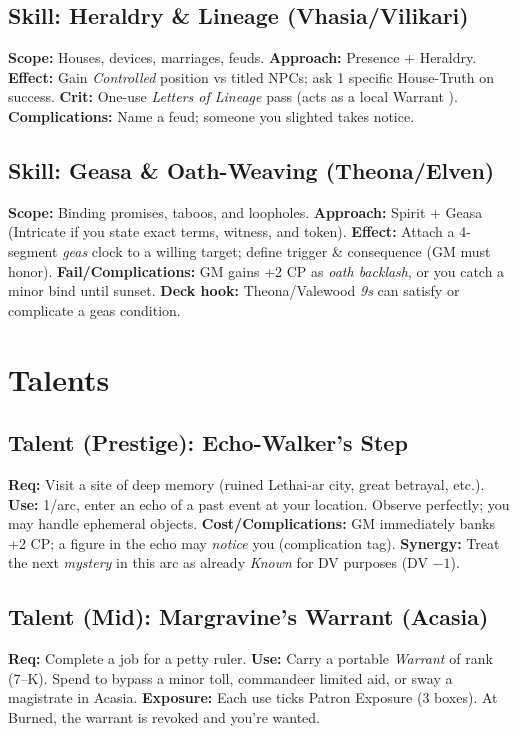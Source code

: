 \subsection{Skill: Heraldry \& Lineage (Vhasia/Vilikari)}
\textbf{Scope:} Houses, devices, marriages, feuds.
\textbf{Approach:} Presence + Heraldry.
\textbf{Effect:} Gain \emph{Controlled} position vs titled NPCs; ask 1 specific House-Truth on success.
\textbf{Crit:} One-use \emph{Letters of Lineage} pass (acts as a local Warrant \SuitDiamond{}).
\textbf{Complications:} Name a feud; someone you slighted takes notice.

\subsection{Skill: Geasa \& Oath-Weaving (Theona/Elven)}
\textbf{Scope:} Binding promises, taboos, and loopholes.
\textbf{Approach:} Spirit + Geasa (Intricate if you state exact terms, witness, and token).
\textbf{Effect:} Attach a 4-segment \emph{geas} clock to a willing target; define trigger \& consequence (GM must honor).
\textbf{Fail/Complications:} GM gains +2 CP as \emph{oath backlash}, or you catch a minor bind until sunset.
\textbf{Deck hook:} Theona/Valewood \emph{9s} can satisfy or complicate a geas condition.

\section{Talents}

\subsection{Talent (Prestige): Echo-Walker's Step}
\textbf{Req:} Visit a site of deep memory (ruined Lethai-ar city, great betrayal, etc.).
\textbf{Use:} 1/arc, enter an echo of a past event at your location. Observe perfectly; you may handle ephemeral objects.
\textbf{Cost/Complications:} GM immediately banks +2 CP; a figure in the echo may \emph{notice} you (complication tag).
\textbf{Synergy:} Treat the next \emph{mystery} \SuitClub{} in this arc as already \emph{Known} for DV purposes (DV $-1$).

\subsection{Talent (Mid): Margravine's Warrant (Acasia)}
\textbf{Req:} Complete a job for a petty ruler.
\textbf{Use:} Carry a portable \SuitDiamond{} \emph{Warrant} of rank (7--K). Spend to bypass a minor toll, commandeer limited aid, or sway a magistrate in Acasia.
\textbf{Exposure:} Each use ticks Patron Exposure (3 boxes). At Burned, the warrant is revoked and you're wanted.

